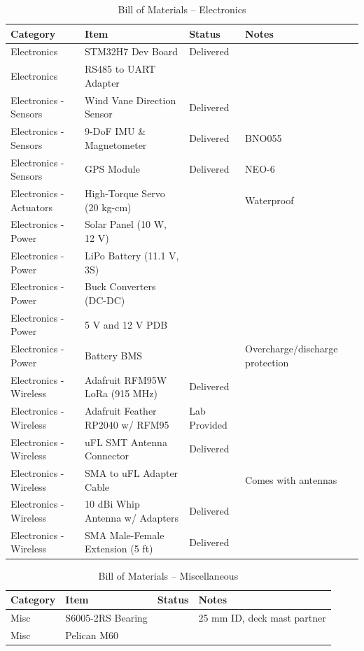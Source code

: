 \begin{table}[htbp]
\label{tab:bom_electronics}
\centering
\caption{Bill of Materials -- Electronics}
\footnotesize
\begin{tabular}{|p{3.45cm}|p{5.5cm}|p{2.2cm}|p{4.75cm}|}
\hline
\textbf{Category} & \textbf{Item} & \textbf{Status} & \textbf{Notes} \\
\hline
Electronics & STM32H7 Dev Board & Delivered & \\
\hline
Electronics & RS485 to UART Adapter & & \\
\hline
Electronics - Sensors & Wind Vane Direction Sensor & Delivered & \\
\hline
Electronics - Sensors & 9-DoF IMU \& Magnetometer & Delivered & BNO055 \\
\hline
Electronics - Sensors & GPS Module & Delivered & NEO-6 \\
\hline
Electronics - Actuators & High-Torque Servo (20 kg-cm) & & Waterproof \\
\hline
Electronics - Power & Solar Panel (10 W, 12 V) & & \\
\hline
Electronics - Power & LiPo Battery (11.1 V, 3S) & & \\
\hline
Electronics - Power & Buck Converters (DC-DC) & & \\
\hline
Electronics - Power & 5 V and 12 V PDB & & \\
\hline
Electronics - Power & Battery BMS & & Overcharge/discharge protection \\
\hline
Electronics - Wireless & Adafruit RFM95W LoRa (915 MHz) & Delivered & \\
\hline
Electronics - Wireless & Adafruit Feather RP2040 w/ RFM95 & Lab Provided & \\
\hline
Electronics - Wireless & uFL SMT Antenna Connector & Delivered & \\
\hline
Electronics - Wireless & SMA to uFL Adapter Cable & & Comes with antennas \\
\hline
Electronics - Wireless & 10 dBi Whip Antenna w/ Adapters & Delivered & \\
\hline
Electronics - Wireless & SMA Male-Female Extension (5 ft) & Delivered & \\
\hline
\end{tabular}
\end{table}

\begin{table}[htbp]
\label{tab:bom_miscellaneous}
\centering
\caption{Bill of Materials -- Miscellaneous}
\footnotesize
\begin{tabular}{|p{3.45cm}|p{5.5cm}|p{2.2cm}|p{4.75cm}|}
\hline
\textbf{Category} & \textbf{Item} & \textbf{Status} & \textbf{Notes} \\
\hline
Misc & S6005-2RS Bearing & & 25 mm ID, deck mast partner \\
\hline
Misc & Pelican M60 & & \\
\hline
\end{tabular}
\end{table}

